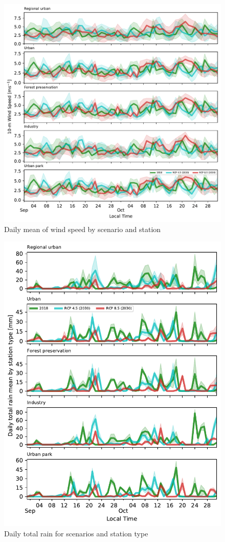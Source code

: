 \begin{figure}[hbt]
  \includegraphics[width=1\textwidth]{fig/ws_change.pdf}
  \caption{Daily mean of wind speed by scenario and station}
  \label{fig:ws_change}
\end{figure}


\begin{figure}[hbt]
  \centering
  \includegraphics{fig/rain_change_all.pdf}
  \caption{Daily total rain for scenarios and station type}
  \label{fig:rain_change}
\end{figure}





  
